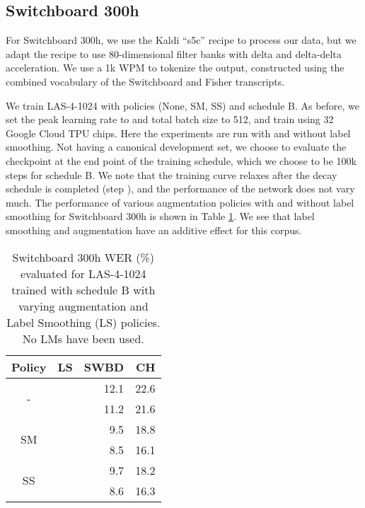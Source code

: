 \documentclass[a4paper]{article}
\begin{document}
\subsection{Switchboard 300h} \label{ss:swbd}

For Switchboard 300h, we use the Kaldi \cite{povey-asru-2011} ``s5c'' recipe to process our data, but we adapt the recipe to use 80-dimensional filter banks with delta and delta-delta acceleration. We use a 1k WPM \cite{schuster-icassp-2012} to tokenize the output, constructed using the combined vocabulary of the Switchboard and Fisher transcripts.

We train LAS-4-1024 with policies (None, SM, SS) and schedule B. As before, we set the peak learning rate to  and total batch size to 512, and train using 32 Google Cloud TPU chips. Here the experiments are run with and without label smoothing. Not having a canonical development set, we choose to evaluate the checkpoint at the end point of the training schedule, which we choose to be 100k steps for schedule B. We note that the training curve relaxes after the decay schedule is completed (step ), and the performance of the network does not vary much. The performance of various augmentation policies with and without label smoothing for Switchboard 300h is shown in Table \ref{t:SWBD}. We see that label smoothing and augmentation have an additive effect for this corpus.

\begin{table}[h!]
  \vskip -0.1in
  \caption{Switchboard 300h WER (\%) evaluated for LAS-4-1024 trained with schedule B with varying augmentation and Label Smoothing (LS) policies. No LMs have been used.}
  \footnotesize
  \label{t:SWBD}
  \centering
  \begin{tabular}{ccrr}
    \toprule
    {\bfseries Policy} & {\bfseries LS} & {\bfseries SWBD} & {\bfseries CH} \\
    \midrule
    \multirow{2}{*}{-} &  & 12.1 & 22.6 \\
    &  & 11.2 & 21.6 \\
    \midrule
    \multirow{2}{*}{SM}&  & 9.5 & 18.8 \\
    &  & 8.5 & 16.1 \\
    \midrule
    \multirow{2}{*}{SS} &  & 9.7 & 18.2 \\
    &  & 8.6 & 16.3 \\
    \bottomrule
  \end{tabular}
\end{table}
\end{document}

